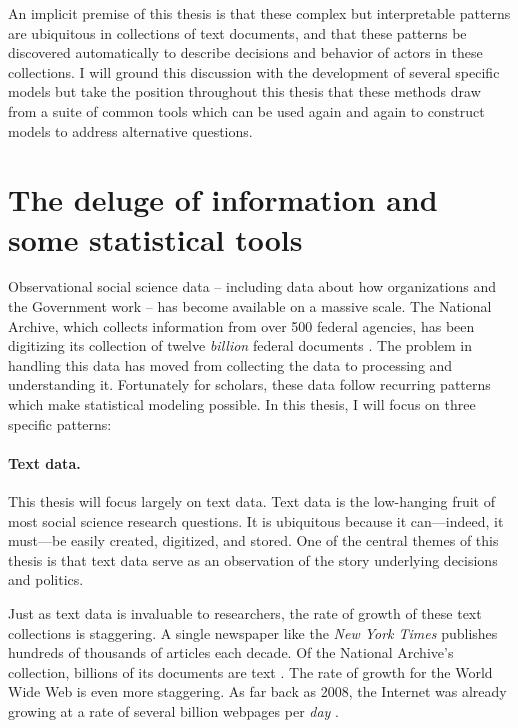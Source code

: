 An implicit premise of this thesis is that these complex but
interpretable patterns are ubiquitous in collections of text
documents, and that these patterns be discovered automatically to
describe decisions and behavior of actors in these collections.  I will
ground this discussion with the development of several specific models
but take the position throughout this thesis that these methods draw
from a suite of common tools which can be used again and again to
construct models to address alternative questions.

\section*{The deluge of information and some statistical tools}

Observational social science data -- including data about how
organizations and the Government work -- has become available on a
massive scale. The National Archive, which collects information from
over 500 federal agencies, has been digitizing its collection of
twelve \emph{billion} federal documents \citep{lazer:2009,
  national_archives:2012a,national_archives:2012b}.  The problem in
handling this data has moved from collecting the data to processing
and understanding it.  Fortunately for scholars, these data follow
recurring patterns which make statistical modeling possible. In this
thesis, I will focus on three specific patterns:

\paragraph{Text data.} This thesis will focus largely on text data.
Text data is the low-hanging fruit of most social science research
questions.  It is ubiquitous because it can---indeed, it must---be
easily created, digitized, and stored. One of the central themes of
this thesis is that text data serve as an observation of the story
underlying decisions and politics.

Just as text data is invaluable to researchers, the rate of growth of
these text collections is staggering.  A single newspaper like the
\emph{New York Times} publishes hundreds of thousands of articles each
decade.  Of the National Archive's collection, billions of its
documents are text
\citep{national_archives:2012a,national_archives:2012b}.  The rate of
growth for the World Wide Web is even more staggering.  As far back as
2008, the Internet was already growing at a rate of several billion
webpages per \emph{day} \citep{googleblog:2008}.

